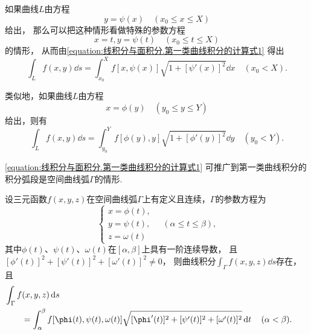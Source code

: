 如果曲线\(L\)由方程\[
	y = \psi(x)
	\quad(x_0 \leq x \leq X)
\]给出，
那么可以把这种情形看做特殊的参数方程\[
	x = t,
	y = \psi(t)
	\quad(x_0 \leq t \leq X)
\]的情形，
从而由\cref{equation:线积分与面积分.第一类曲线积分的计算式1} 得出\begin{equation}
	\int_L f(x,y) \dd{s}
	= \int_{x_0}^X f[x,\psi(x)] \sqrt{1+[\psi'(x)]^2} \dd{x}
	\quad(x_0 < X).
\end{equation}

类似地，如果曲线\(L\)由方程\[
	x = \phi(y)
	\quad(y_0 \leq y \leq Y)
\]给出，则有
	\begin{equation}
		\int_L f(x,y) \dd{s}
		= \int_{y_0}^Y f[\phi(y),y] \sqrt{1+[\phi'(y)]^2} \dd{y}
	\quad(y_0 < Y).
\end{equation}

\cref{equation:线积分与面积分.第一类曲线积分的计算式1} 可推广到第一类曲线积分的积分弧段是空间曲线弧\(\Gamma\)的情形.
\begin{theorem}
设三元函数\(f(x,y,z)\)在空间曲线弧\(\Gamma\)上有定义且连续，\(\Gamma\)的参数方程为\[
	\left\{ \begin{array}{l}
		x = \phi(t), \\
		y = \psi(t), \\
		z = \omega(t)
	\end{array} \right.
	\quad(\alpha \leq t \leq \beta),
\]其中\(\phi(t)\)、\(\psi(t)\)、\(\omega(t)\)在\([\alpha,\beta]\)上具有一阶连续导数，
且\([\phi'(t)]^2+[\psi'(t)]^2+[\omega'(t)]^2 \neq 0\)，
则曲线积分\(\int_\Gamma f(x,y,z) \dd{s}\)存在，
且\begin{equation}\label{equation:线积分与面积分.第一类曲线积分的计算式2}
	\begin{aligned}
		&\hspace{-20pt}
		\int_\Gamma f(x,y,z) \dd{s} \\
		&= \int_\alpha^\beta f[\phi(t),\psi(t),\omega(t)] \sqrt{[\phi'(t)]^2+[\psi'(t)]^2+[\omega'(t)]^2} \dd{t}
		\quad(\alpha<\beta).
	\end{aligned}
\end{equation}
\end{theorem}

